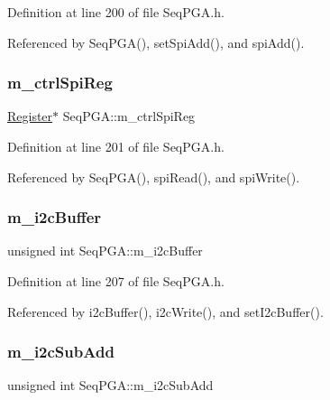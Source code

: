 Definition at line 200 of file Seq\+P\+G\+A.\+h.



Referenced by Seq\+P\+G\+A(), set\+Spi\+Add(), and spi\+Add().

\mbox{\label{classSeqPGA_ab6597288860f5172540059345256f9a9}} 
\subsubsection{\texorpdfstring{m\+\_\+ctrl\+Spi\+Reg}{m\_ctrlSpiReg}}
{\footnotesize\ttfamily \hyperlink{classRegister}{Register}$\ast$ Seq\+P\+G\+A\+::m\+\_\+ctrl\+Spi\+Reg\hspace{0.3cm}{\ttfamily [private]}}



Definition at line 201 of file Seq\+P\+G\+A.\+h.



Referenced by Seq\+P\+G\+A(), spi\+Read(), and spi\+Write().

\mbox{\label{classSeqPGA_afcef519379e9c6ba624ba58a4eac79f1}} 
\subsubsection{\texorpdfstring{m\+\_\+i2c\+Buffer}{m\_i2cBuffer}}
{\footnotesize\ttfamily unsigned int Seq\+P\+G\+A\+::m\+\_\+i2c\+Buffer\hspace{0.3cm}{\ttfamily [private]}}



Definition at line 207 of file Seq\+P\+G\+A.\+h.



Referenced by i2c\+Buffer(), i2c\+Write(), and set\+I2c\+Buffer().

\mbox{\label{classSeqPGA_a82bda98edb9681aff47733e83ac8bc4f}} 
\subsubsection{\texorpdfstring{m\+\_\+i2c\+Sub\+Add}{m\_i2cSubAdd}}
{\footnotesize\ttfamily unsigned int Seq\+P\+G\+A\+::m\+\_\+i2c\+Sub\+Add\hspace{0.3cm}{\ttfamily [private]}}



